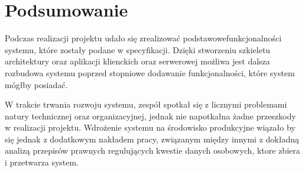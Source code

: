 \newpage\section{Podsumowanie} \label{sec:podsumowanie}
 
 Podczas realizacji projektu udało się zrealizować podstawowefunkcjonalności systemu, które zostały podane w specyfikacji. Dzięki stworzeniu szkieletu architektury oraz aplikacji klienckich oraz serwerowej możliwa jest dalsza rozbudowa systemu poprzed stopniowe dodawanie funkcjonalności, które system mógłby posiadać.

W trakcie trwania rozwoju systemu, zespół spotkał się z licznymi problemami natury technicznej oraz organizacyjnej, jednak nie napotkałna żadne przeszkody w realizacji projektu. Wdrożenie systemu na środowisko produkcyjne wiązało by się jednak z dodatkowym nakładem pracy, związanym między innymi z dokładną analizą przepisów prawnych regulujących kwestie danych osobowych, ktore zbiera i przetwarza system.
